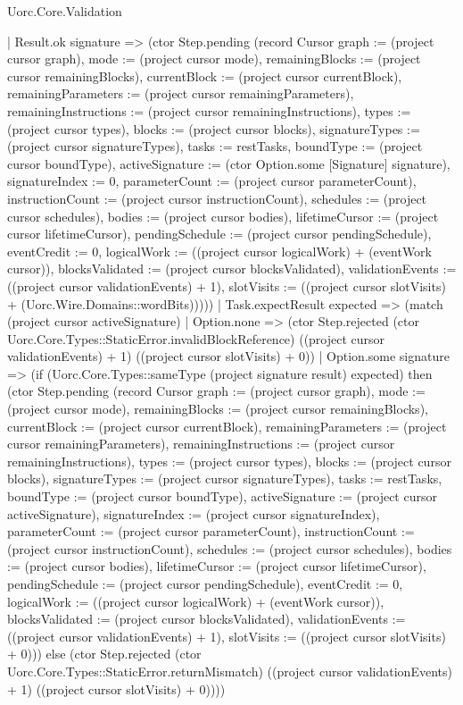 \begin{lexlean}{Uorc.Core.Validation}
\begin{semanticmodule}
{        | Result.ok signature => (ctor Step.pending (record Cursor {graph := (project cursor graph), mode := (project cursor mode), remainingBlocks := (project cursor remainingBlocks), currentBlock := (project cursor currentBlock), remainingParameters := (project cursor remainingParameters), remainingInstructions := (project cursor remainingInstructions), types := (project cursor types), blocks := (project cursor blocks), signatureTypes := (project cursor signatureTypes), tasks := restTasks, boundType := (project cursor boundType), activeSignature := (ctor Option.some [Signature] signature), signatureIndex := 0, parameterCount := (project cursor parameterCount), instructionCount := (project cursor instructionCount), schedules := (project cursor schedules), bodies := (project cursor bodies), lifetimeCursor := (project cursor lifetimeCursor), pendingSchedule := (project cursor pendingSchedule), eventCredit := 0, logicalWork := ((project cursor logicalWork) + (eventWork cursor)), blocksValidated := (project cursor blocksValidated), validationEvents := ((project cursor validationEvents) + 1), slotVisits := ((project cursor slotVisits) + (Uorc.Wire.Domains::wordBits))})))
      | Task.expectResult expected => (match (project cursor activeSignature)
        | Option.none => (ctor Step.rejected (ctor Uorc.Core.Types::StaticError.invalidBlockReference) ((project cursor validationEvents) + 1) ((project cursor slotVisits) + 0))
        | Option.some signature => (if (Uorc.Core.Types::sameType (project signature result) expected) then (ctor Step.pending (record Cursor {graph := (project cursor graph), mode := (project cursor mode), remainingBlocks := (project cursor remainingBlocks), currentBlock := (project cursor currentBlock), remainingParameters := (project cursor remainingParameters), remainingInstructions := (project cursor remainingInstructions), types := (project cursor types), blocks := (project cursor blocks), signatureTypes := (project cursor signatureTypes), tasks := restTasks, boundType := (project cursor boundType), activeSignature := (project cursor activeSignature), signatureIndex := (project cursor signatureIndex), parameterCount := (project cursor parameterCount), instructionCount := (project cursor instructionCount), schedules := (project cursor schedules), bodies := (project cursor bodies), lifetimeCursor := (project cursor lifetimeCursor), pendingSchedule := (project cursor pendingSchedule), eventCredit := 0, logicalWork := ((project cursor logicalWork) + (eventWork cursor)), blocksValidated := (project cursor blocksValidated), validationEvents := ((project cursor validationEvents) + 1), slotVisits := ((project cursor slotVisits) + 0)})) else (ctor Step.rejected (ctor Uorc.Core.Types::StaticError.returnMismatch) ((project cursor validationEvents) + 1) ((project cursor slotVisits) + 0))))
}
\end{semanticmodule}
\end{lexlean}
